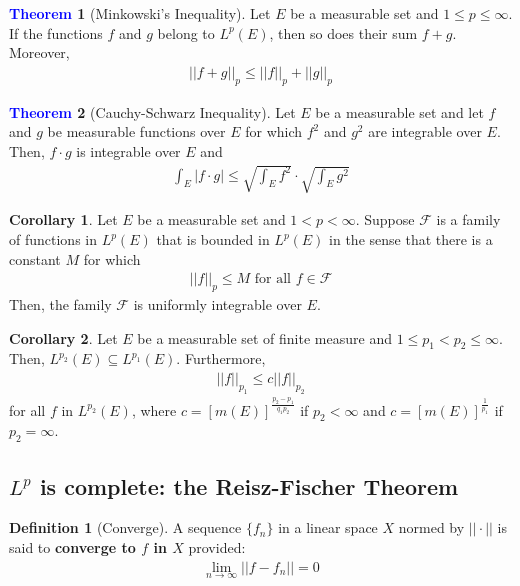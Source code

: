 \documentclass[11pt]{article}
\theoremstyle{definition}
\theoremstyle{definition}
\newtheorem{theorem}{\textcolor{blue}{Theorem}}
\newtheorem{corollary}{Corollary}
\theoremstyle{definition}
\newtheorem{definition}{\textcolor{OliveGreen}{Definition}}
\theoremstyle{remark}
\begin{document}
\begin{theorem}[Minkowski's Inequality]
	Let $E$ be a measurable set and $1 \leq p \leq \infty$. If the functions $f$ and $g$ belong to $L^p(E)$, then so does their sum $f+g$. Moreover, 
	\begin{align}
		||f+g||_p \leq ||f||_p + ||g||_p 
	\end{align}
\end{theorem}

\begin{theorem}[Cauchy-Schwarz Inequality]
	Let $E$ be a measurable set and let $f$ and $g$ be measurable functions over $E$ for which $f^2$ and $g^2$ are integrable over $E$. Then, $f \cdot g$ is integrable over $E$ and 
	\begin{align}
		\int_E |f \cdot g| \leq \sqrt{\int_E f^2} \cdot  \sqrt{\int_E g^2}	
	\end{align}
\end{theorem}

\begin{corollary}
	Let $E$ be a measurable set and $1 < p < \infty$. Suppose $\mathcal{F}$ is a family of functions  in $L^p(E)$ that is bounded in $L^p(E)$ in the sense that there is a constant $M$ for which 
	\begin{align*}
		|| f ||_p \leq M \text{ for all } f \in \mathcal{F}	
	\end{align*}
	Then, the family $\mathcal{F}$ is uniformly integrable over $E$. 
\end{corollary}

\begin{corollary}
	Let $E$ be a measurable set of finite measure and $1 \leq p_1 < p_2 \leq \infty$. Then, $L^{p_2}(E) \subseteq L^{p_1} (E)$. Furthermore, 
	\begin{align*}
		||f ||_{p_1} \leq c ||f||_{p_2} 	
	\end{align*}
	for all $f$ in $L^{p_2}(E)$, where $ c = [m(E)]^{\frac{p_2 - p_1}{q_1 p_2}}$ if $p_2 < \infty$ and $c = [m(E)]^{\frac{1}{p_1}}$ if $p_2 = \infty$. 
\end{corollary}

\subsection{$L^p$ is complete: the Reisz-Fischer Theorem}

\begin{definition}[Converge]
	A sequence $\{ f_n \}$ in a linear space $X$ normed by $|| \cdot ||$ is said to \textbf{converge to $f$ in $X$} provided: 
	\begin{align*}
		\lim_{n \rightarrow \infty} || f - f_n || = 0 	
	\end{align*}
\end{definition}
\end{document}
